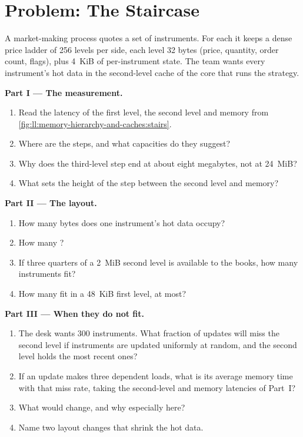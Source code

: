 \section{Problem: The Staircase}

\begin{problem}\label{pb:ll:memory-hierarchy-and-caches:1}
A market-making process quotes a set of instruments. For each it keeps a dense price ladder of 256 levels per side,
each level 32 bytes (price, quantity, order count, flags), plus 4~KiB of per-instrument state. The team wants every
instrument's hot data in the second-level cache of the core that runs the strategy.

\medskip\noindent\textbf{Part I --- The measurement.}
\begin{enumerate}
\item Read the latency of the first level, the second level and memory from
\cref{fig:ll:memory-hierarchy-and-caches:stairs}.
\item Where are the steps, and what capacities do they suggest?
\item Why does the third-level step end at about eight megabytes, not at 24~MiB?
\item What sets the height of the step between the second level and memory?
\end{enumerate}

\medskip\noindent\textbf{Part II --- The layout.}
\begin{enumerate}[resume]
\item How many bytes does one instrument's hot data occupy?
\item How many ?
\item If three quarters of a 2~MiB second level is available to the books, how many instruments fit?
\item How many fit in a 48~KiB first level, at most?
\end{enumerate}

\medskip\noindent\textbf{Part III --- When they do not fit.}
\begin{enumerate}[resume]
\item The desk wants 300 instruments. What fraction of updates will miss the second level if instruments are updated
uniformly at random, and the second level holds the most recent ones?
\item If an update makes three dependent loads, what is its average memory time with that miss rate, taking the
second-level and memory latencies of Part~I?
\item What would  change, and why especially here?
\item Name two layout changes that shrink the hot data.
\end{enumerate}


\end{problem}
